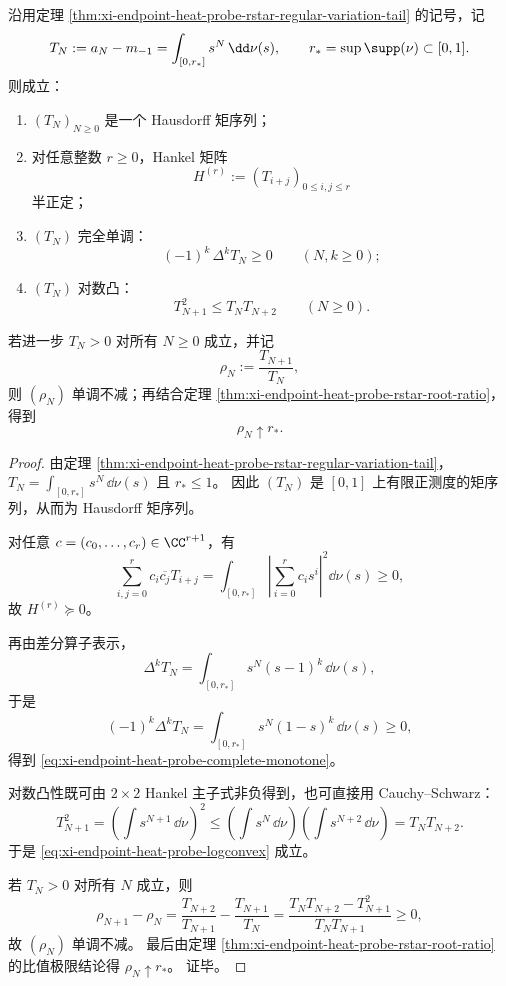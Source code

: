 \begin{theorem}\label{thm:xi-endpoint-heat-probe-hausdorff-hankel-closure}
沿用定理 \ref{thm:xi-endpoint-heat-probe-rstar-regular-variation-tail} 的记号，记
\[
T_N:=a_N-m_{-1}=\int_{[0,r_\ast]} s^N\,\dd\nu(s),
\qquad
r_\ast=\sup\supp(\nu)\subset[0,1].
\]
则成立：
\begin{enumerate}
  \item \((T_N)_{N\ge 0}\) 是一个 Hausdorff 矩序列；
  \item 对任意整数 \(r\ge 0\)，Hankel 矩阵
  \[
  H^{(r)}:=(T_{i+j})_{0\le i,j\le r}
  \]
  半正定；
  \item \((T_N)\) 完全单调：
  \begin{equation}\label{eq:xi-endpoint-heat-probe-complete-monotone}
  \boxed{\;(-1)^k\,\Delta^k T_N\ge 0\qquad(N,k\ge 0);\;}
  \end{equation}
  \item \((T_N)\) 对数凸：
  \begin{equation}\label{eq:xi-endpoint-heat-probe-logconvex}
  \boxed{\;T_{N+1}^2\le T_NT_{N+2}\qquad(N\ge 0).\;}
  \end{equation}
\end{enumerate}
若进一步 \(T_N>0\) 对所有 \(N\ge 0\) 成立，并记
\[
\rho_N:=\frac{T_{N+1}}{T_N},
\]
则 \((\rho_N)\) 单调不减；再结合定理
\ref{thm:xi-endpoint-heat-probe-rstar-root-ratio}，得到
\[
\rho_N\uparrow r_\ast.
\]
\end{theorem}
\begin{proof}
由定理 \ref{thm:xi-endpoint-heat-probe-rstar-regular-variation-tail}，
\(
T_N=\int_{[0,r_\ast]} s^N\,\dd\nu(s)
\)
且 \(r_\ast\le 1\)。
因此 \((T_N)\) 是 \([0,1]\) 上有限正测度的矩序列，从而为 Hausdorff 矩序列。

对任意 \(c=(c_0,\dots,c_r)\in\CC^{r+1}\)，有
\[
\sum_{i,j=0}^{r}c_i\overline{c_j}T_{i+j}
=
\int_{[0,r_\ast]}
\left|\sum_{i=0}^{r}c_i s^i\right|^2\dd\nu(s)\ge 0,
\]
故 \(H^{(r)}\succeq 0\)。

再由差分算子表示，
\[
\Delta^k T_N
=
\int_{[0,r_\ast]} s^N(s-1)^k\,\dd\nu(s),
\]
于是
\[
(-1)^k\Delta^k T_N
=
\int_{[0,r_\ast]} s^N(1-s)^k\,\dd\nu(s)\ge 0,
\]
得到 \eqref{eq:xi-endpoint-heat-probe-complete-monotone}。

对数凸性既可由 \(2\times 2\) Hankel 主子式非负得到，也可直接用 Cauchy--Schwarz：
\[
T_{N+1}^2
=
\left(\int s^{N+1}\,\dd\nu\right)^2
\le
\left(\int s^N\,\dd\nu\right)\left(\int s^{N+2}\,\dd\nu\right)
=
T_NT_{N+2}.
\]
于是 \eqref{eq:xi-endpoint-heat-probe-logconvex} 成立。

若 \(T_N>0\) 对所有 \(N\) 成立，则
\[
\rho_{N+1}-\rho_N
=
\frac{T_{N+2}}{T_{N+1}}-\frac{T_{N+1}}{T_N}
=
\frac{T_NT_{N+2}-T_{N+1}^2}{T_NT_{N+1}}\ge 0,
\]
故 \((\rho_N)\) 单调不减。
最后由定理 \ref{thm:xi-endpoint-heat-probe-rstar-root-ratio} 的比值极限结论得
\(
\rho_N\uparrow r_\ast
\)。
证毕。
\end{proof}


